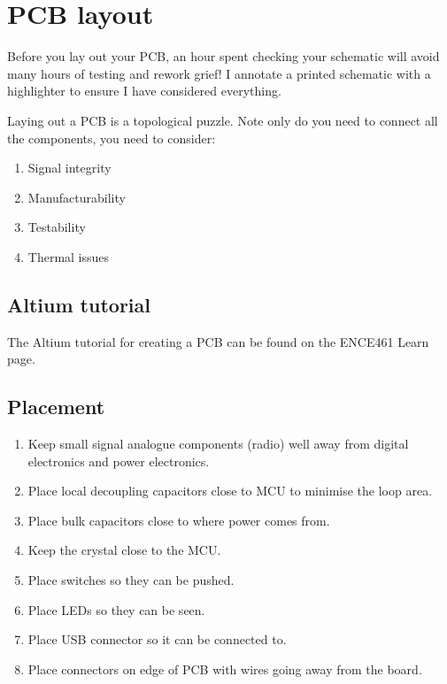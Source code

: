 \chapter{PCB layout}

Before you lay out your PCB, an hour spent checking your schematic
will avoid many hours of testing and rework grief!  I annotate a
printed schematic with a highlighter to ensure I have considered
everything.

Laying out a PCB is a topological puzzle.  Note only do you need to
connect all the components, you need to consider:
%
\begin{enumerate}
\item Signal integrity

\item Manufacturability

\item Testability

\item Thermal issues
\end{enumerate}



\section{Altium tutorial}

The Altium tutorial for creating a PCB can be found on the ENCE461
Learn page.


\label{pcb-recommendations}

\section{Placement}
\label{placement}

\begin{enumerate}
\item
  Keep small signal analogue components (radio) well away from digital
  electronics and power electronics.
\item
  Place local decoupling capacitors close to MCU to minimise the loop area.
\item
  Place bulk capacitors close to where power comes from.
\item
  Keep the crystal close to the MCU.
\item
  Place switches so they can be pushed.
\item
  Place LEDs so they can be seen.
\item
  Place USB connector so it can be connected to.
\item
  Place connectors on edge of PCB with wires going away from the board.
\end{enumerate}


